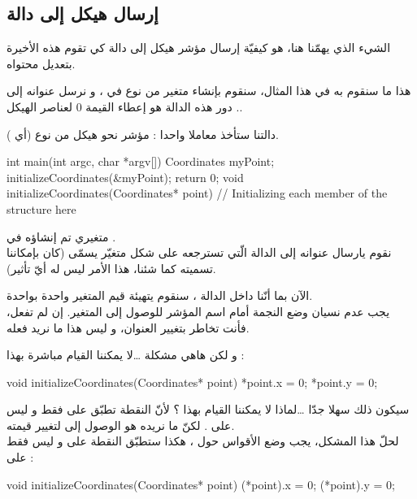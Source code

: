 \subsection{إرسال هيكل إلى دالة}

الشيء الذي يهمّنا هنا، هو كيفيّة إرسال مؤشر هيكل إلى دالة كي تقوم هذه الأخيرة بتعديل محتواه.

هذا ما سنقوم به في هذا المثال، سنقوم بإنشاء متغير من نوع
في
،
و نرسل عنوانه إلى
.
دور هذه الدالة هو إعطاء القيمة 0 لعناصر الهيكل.

دالتنا
ستأخذ معاملا واحدا : مؤشر نحو هيكل من نوع
(أي
).

\begin{Csource}
int main(int argc, char *argv[])
{
	Coordinates myPoint;
	initializeCoordinates(&myPoint);
	 return 0;
}
void initializeCoordinates(Coordinates* point)
{
	// Initializing each member of the structure here
}
\end{Csource}

متغيري
تم إنشاؤه في
.\\
نقوم يارسال عنوانه إلى الدالة
الّتي تسترجعه على شكل متغيّر يسمّى
(كان بإمكاننا تسميته كما شئنا، هذا الأمر ليس له أيّ تأثير).

الآن بما أنّنا داخل الدالة
،
سنقوم يتهيئة قيم المتغير
واحدة بواحدة.\\
يجب عدم نسيان وضع النجمة أمام اسم المؤشر للوصول إلى المتغير. إن لم تفعل، فأنت تخاطر بتغيير العنوان، و ليس هذا ما نريد فعله.

و لكن هاهي مشكلة \dots لا يمكننا القيام مباشرة بهذا :

\begin{Csource}
void initializeCoordinates(Coordinates* point)
{
	*point.x = 0;
	*point.y = 0;
}
\end{Csource}

سيكون ذلك سهلا جدّا \dots لماذا لا يمكننا القيام بهذا ؟
لأنّ النقطة تطبّق على
فقط و ليس على
.
لكنّ ما نريده هو الوصول إلى
لتغيير قيمته.\\
لحلّ هذا المشكل، يجب وضع الأقواس حول
،
هكذا ستطبّق النقطة على
و ليس فقط على
 :

\begin{Csource}
void initializeCoordinates(Coordinates* point)
{
	(*point).x = 0;
	(*point).y = 0;
}
\end{Csource}


